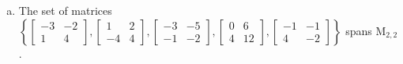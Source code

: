 \begin{exerciseAnswer}
\begin{enumerate}[(a)]
\begin{center}
\begin{minipage}{0.8\textwidth}
\[\begin{array}{cc}
1 & 2 \\
-4 & 4
\end{array}\right] + y_{3} \left[\begin{array}{cc}
-3 & -5 \\
-1 & -2
\end{array}\right] + y_{4} \left[\begin{array}{cc}
0 & 6 \\
4 & 12
\end{array}\right] + y_{5} \left[\begin{array}{cc}
-1 & -1 \\
4 & -2
\end{array}\right] =B\] has a solution for every \(B \in \mathrm{M}_{2,2}\). 
\end{minipage}\end{center}
    
\item The set of matrices \( \left\{ \left[\begin{array}{cc}
-3 & -2 \\
1 & 4
\end{array}\right] , \left[\begin{array}{cc}
1 & 2 \\
-4 & 4
\end{array}\right] , \left[\begin{array}{cc}
-3 & -5 \\
-1 & -2
\end{array}\right] , \left[\begin{array}{cc}
0 & 6 \\
4 & 12
\end{array}\right] , \left[\begin{array}{cc}
-1 & -1 \\
4 & -2
\end{array}\right] \right\} \) spans \(\mathrm{M}_{2,2}\). 
\end{enumerate}
    
\end{exerciseAnswer}
    
